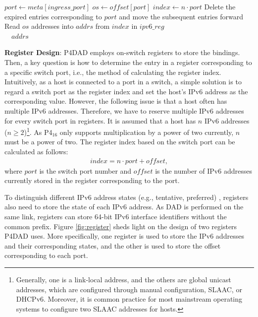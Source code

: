 \documentclass[a4paper,fleqn]{cas-dc}
\begin{document}
\begin{algorithm}[!t]
\begin{algorithmic}[1]
            \State
                \State $port \gets meta[ingress\_port]$
                \State $os \gets o\!f\!\!f\!set[port]$
                \State $index \gets n \cdot port$
                \State Delete the expired entries corresponding to $port$ and move the subsequent entries forward
                \State Read $os$ addresses into $addrs$ from $index$ in $ipv6\_reg$\\
                \quad\ \  \Return $addrs$ 
            \EndFunction
            \end{algorithmic}
        \end{algorithm}

        \textbf{Register Design}: P4DAD employs on-switch registers to store the bindings. Then, a key question is how to determine the entry in a register corresponding to a specific switch port, i.e., the method of calculating the register index.  
        Intuitively, as a host is connected to a port in a switch, a simple solution is to regard a switch port as the register index and set the host's IPv6 address as the corresponding value. 
        However, the following issue is that a host often has multiple IPv6 addresses. Therefore, we have to reserve multiple IPv6 addresses for every switch port in registers. 
        It is assumed that a host has $n$ IPv6 addresses ($n \geq 2$)\footnote{Generally, one is a link-local address, and the others are global unicast addresses, which are configured through manual configuration, SLAAC, or DHCPv6. Moreover, it is common practice for most mainstream operating systems to configure two SLAAC addresses for hosts.}. As P4$_{16}$ \cite{P4-16} only supports multiplication by a power of two currently, $n$ must be a power of two.
        The register index based on the switch port can be calculated as follows: 
        \begin{equation}
                \label{index-calculation}
                \begin{aligned}
                    index = n \cdot port + of\!fset,
                \end{aligned}
        \end{equation}
        where $port$ is the switch port number and $of\!fset$ is the number of IPv6 addresses currently stored in the register corresponding to the port. 

        To distinguish different IPv6 address states (e.g., tentative, preferred) \cite{slaac}, registers also need to store the state of each IPv6 address. As DAD is performed on the same link, registers can store 64-bit IPv6 interface identifiers without the common prefix. Figure \ref{fig:register} sheds light on the design of two registers P4DAD uses. More specifically, one register is used to store the IPv6 addresses and their corresponding states, and the other is used to store the offset corresponding to each port.
\end{document}
